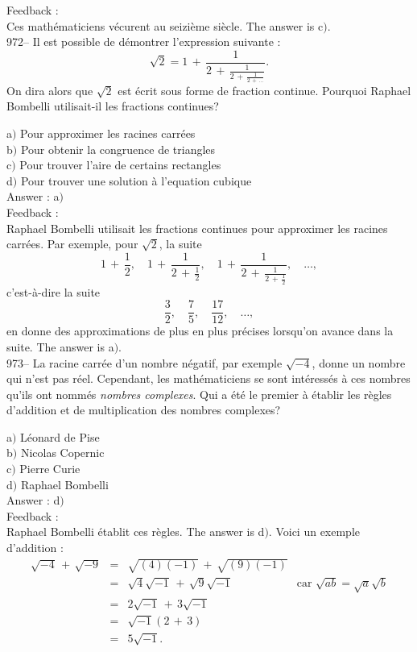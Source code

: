 ﻿\documentclass[letterpaper, 12pt]{article}
\begin{document}
Feedback : \\
Ces math\'ematiciens v\'ecurent au seizi\`eme si\`ecle. The answer is
c$)$.\\

972-- Il est possible de d\'emontrer l'expression suivante :
$$\sqrt2=1\,+\,\frac1{2\,+\,\frac1{2\,+\,\frac1{2\,+\,\ldots}}}.$$
On dira alors que $\sqrt2$ est \'ecrit sous forme de fraction
continue. Pourquoi Raphael Bombelli utilisait-il les fractions
continues?

a$)$ Pour approximer les racines carr\'ees \\
b$)$ Pour obtenir la congruence de triangles \\
c$)$ Pour trouver l'aire de certains rectangles  \\
d$)$ Pour trouver une solution \`a l'equation cubique \\

Answer : a$)$\\

Feedback : \\
Raphael Bombelli utilisait les fractions continues pour approximer
les racines carr\'ees. Par exemple, pour $\sqrt2$, la suite
$$1\,+\,\frac12,\quad1\,+\,\frac1{2\,+\,\frac12},\quad1\,+\,\frac1{2\,+\,\frac1{2\,+\,\frac12}},\quad\ldots,$$
c'est-\`a-dire la suite
$$\displaystyle\frac32,\quad\displaystyle\frac75,\quad\displaystyle\frac{17}{12},\quad\ldots,$$
en donne des approximations de plus en plus pr\'ecises lorsqu'on avance dans
la suite. The answer is a$)$.\\

973-- La racine carr\'ee d'un nombre n\'egatif, par exemple
$\sqrt{-4}$, donne un nombre qui n'est pas r\'eel. Cependant, les
math\'ematiciens se sont int\'eress\'es \`a ces nombres qu'ils ont
nomm\'es {\sl nombres complexes}. Qui a \'et\'e le premier \`a
\'etablir les r\`egles d'addition et de multiplication des nombres
complexes?

a$)$ L\'eonard de Pise \\
b$)$ Nicolas Copernic \\
c$)$ Pierre Curie  \\
d$)$ Raphael Bombelli \\

Answer : d$)$\\

Feedback :\\
Raphael Bombelli \'etablit ces r\`egles. The answer is d$)$.
Voici un exemple d'addition :
$$\begin{array}{rcll}
\sqrt{-4}\,+\,\sqrt{-9} & = & \sqrt{(4)(-1)}\,+\,\sqrt{(9)(-1)}   & \\
[3mm]
                    & = & \sqrt4\sqrt{-1}\,+\,\sqrt9\sqrt{-1} & \text{car }
\sqrt{ab}=\sqrt a\sqrt b \\ [3mm]
                    & = & 2\sqrt{-1}\,+\,3\sqrt{-1}           & \\ [3mm]
                    & = & \sqrt{-1}(2\,+\,3)                  & \\ [3mm]
                    & = & 5\sqrt{-1}.
\end{array}$$
\\
\end{document}
